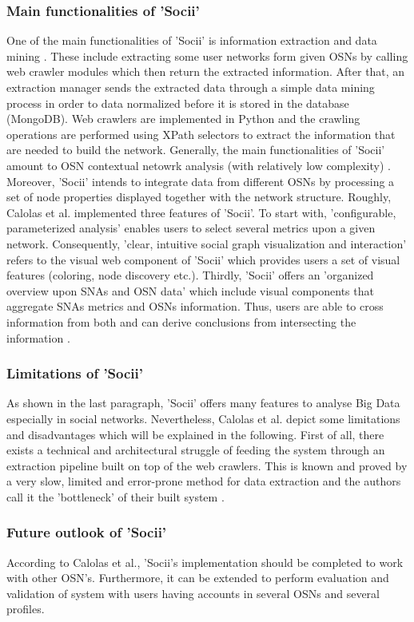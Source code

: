 \subsubsection{Main functionalities of 'Socii'}

One of the main functionalities of 'Socii' is information extraction and data mining \cite[p.223]{trends_nosql}. These include extracting some user networks form given OSNs by calling web crawler modules which then return the extracted information. After that, an extraction manager sends the extracted data through a simple data mining process in order to data normalized before it is stored in the database (MongoDB). Web crawlers are implemented in Python and the crawling operations are performed using XPath selectors to extract the information that are needed to build the network.
Generally, the main functionalities of 'Socii' amount to OSN contextual netowrk analysis (with relatively low complexity) \cite[p.227]{trends_nosql}. Moreover, 'Socii' intends to integrate data from different OSNs by processing a set of node properties displayed together with the network structure. Roughly, Calolas et al. implemented three features of 'Socii'. To start with, 'configurable, parameterized analysis' enables users to select several metrics upon a given network. Consequently, 'clear, intuitive social graph visualization and interaction' refers to the visual web component of 'Socii' which provides users a set of visual features (coloring, node discovery etc.). Thirdly, 'Socii' offers an 'organized overview upon SNAs and OSN data' which include visual components that aggregate SNAs metrics and OSNs information. Thus, users are able to cross information from both and can derive conclusions from intersecting the information \cite{trends_nosql}. 

\subsubsection{Limitations of 'Socii'}

As shown in the last paragraph, 'Socii' offers many features to analyse Big Data especially in social networks. Nevertheless, Calolas et al. depict some limitations and disadvantages which will be explained in the following. 
First of all, there exists a technical and architectural struggle of feeding the system through an extraction pipeline built on top of the web crawlers. This is known and proved by a very slow, limited and error-prone method for data extraction and the authors call it the 'bottleneck' of their built system \cite [p.227]{trends_nosql}. 

\subsubsection{Future outlook of 'Socii'}

According to Calolas et al., 'Socii's implementation should be completed to work with other OSN's. Furthermore, it can be extended to perform evaluation and validation of system with users having accounts in several OSNs and several profiles. 

